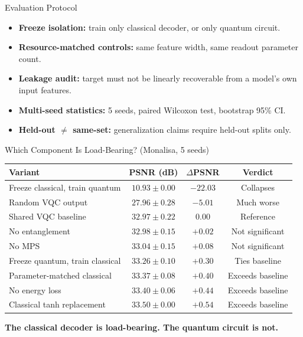 \documentclass[aspectratio=169]{beamer}
\begin{document}
\begin{frame}{Evaluation Protocol}
\begin{itemize}
  \item \textbf{Freeze isolation:} train only classical decoder, or only quantum circuit.
  \item \textbf{Resource-matched controls:} same feature width, same readout parameter count.
  \item \textbf{Leakage audit:} target must not be linearly recoverable from a model's own input features.
  \item \textbf{Multi-seed statistics:} 5 seeds, paired Wilcoxon test, bootstrap 95\% CI.
  \item \textbf{Held-out $\neq$ same-set:} generalization claims require held-out splits only.
\end{itemize}
\end{frame}

\begin{frame}{Which Component Is Load-Bearing? (Monalisa, 5 seeds)}
\centering
\scriptsize
\begin{tabular}{lccc}
\toprule
Variant & PSNR (dB) & $\Delta$PSNR & Verdict \\
\midrule
Freeze classical, train quantum & $10.93\pm0.00$ & $-22.03$ & Collapses \\
Random VQC output & $27.96\pm0.28$ & $-5.01$ & Much worse \\
Shared VQC baseline & $32.97\pm0.22$ & $0.00$ & Reference \\
No entanglement & $32.98\pm0.15$ & $+0.02$ & Not significant \\
No MPS & $33.04\pm0.15$ & $+0.08$ & Not significant \\
Freeze quantum, train classical & $33.26\pm0.10$ & $+0.30$ & Ties baseline \\
Parameter-matched classical & $33.37\pm0.08$ & $+0.40$ & Exceeds baseline \\
No energy loss & $33.40\pm0.06$ & $+0.44$ & Exceeds baseline \\
Classical tanh replacement & $33.50\pm0.00$ & $+0.54$ & Exceeds baseline \\
\bottomrule
\end{tabular}
\vspace{6pt}
\begin{block}{}
\centering \textbf{The classical decoder is load-bearing. The quantum circuit is not.}
\end{block}
\end{frame}
\end{document}
